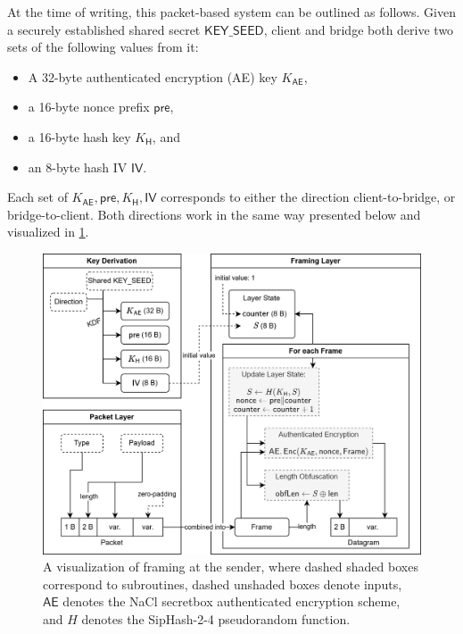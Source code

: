 At the time of writing, this packet-based system can be outlined as follows. Given a securely established shared secret $\mathsf{KEY\_SEED}$, client and bridge both derive two sets of the following values from it:
\begin{itemize}
    \item A 32-byte authenticated encryption (AE) key $K_\mathsf{AE}$,
    \item a 16-byte nonce prefix $\mathsf{pre}$,
    \item a 16-byte hash key $K_\mathsf{H}$, and
    \item an 8-byte hash IV $\mathsf{IV}$.
\end{itemize}

Each set of $K_\mathsf{AE}, \mathsf{pre}, K_\mathsf{H}, \mathsf{IV}$ corresponds to either the direction client-to-bridge, or bridge-to-client. Both directions work in the same way presented below and visualized in \cref{fig:framing}.

\begin{figure}
    \centering
    \includegraphics[width=\linewidth]{images/packet-framing.drawio.png}
    \caption[
        A visualization of \obfsfour{} framing at the sender.
    ]{
        A visualization of \obfsfour{} framing at the sender, where dashed shaded boxes correspond to subroutines, dashed unshaded boxes denote inputs, $\mathsf{AE}$ denotes the NaCl secretbox authenticated encryption scheme, and $H$ denotes the SipHash-2-4 pseudorandom function. 
    }
    \label{fig:framing}
\end{figure}

